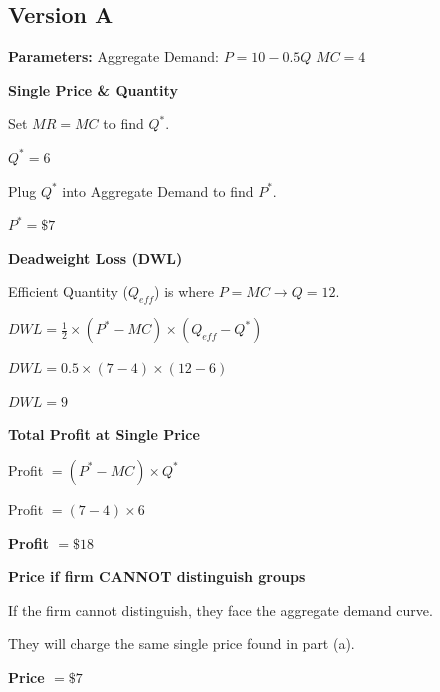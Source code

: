 \documentclass[12pt]{article}
\begin{document}
\subsection*{Version A}

\textbf{Parameters:} Aggregate Demand: $P = 10 - 0.5Q$ \textbar{} $MC = 4$

\begin{subqs}

\item \textbf{Single Price \& Quantity}
  \begin{solbullets}
    \item Set $MR = MC$ to find $Q^*$.
    \item \textbf{$Q^* = 6$}
    \item Plug $Q^*$ into Aggregate Demand to find $P^*$.
    \item \textbf{$P^* = \$7$}
  \end{solbullets}

\item \textbf{Deadweight Loss (DWL)}
  \begin{solbullets}
    \item Efficient Quantity ($Q_{eff}$) is where $P = MC \rightarrow Q = 12$.
    \item $DWL = \frac{1}{2} \times (P^* - MC) \times (Q_{eff} - Q^*)$
    \item $DWL = 0.5 \times (7 - 4) \times (12 - 6)$
    \item \textbf{$DWL = 9$}
  \end{solbullets}

\item \textbf{Total Profit at Single Price}
  \begin{solbullets}
    \item Profit $= (P^* - MC) \times Q^*$
    \item Profit $= (7 - 4) \times 6$
    \item \textbf{Profit $= \$18$}
  \end{solbullets}

\item \textbf{Price if firm CANNOT distinguish groups}
  \begin{solbullets}
    \item If the firm cannot distinguish, they face the aggregate demand curve.
    \item They will charge the same single price found in part (a).
    \item \textbf{Price $= \$7$}
  \end{solbullets}


\end{subqs}
\end{document}

